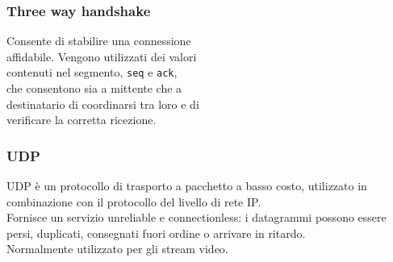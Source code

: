 \documentclass[aspectratio=169]{beamer}
\begin{document}
    \begin{frame}
        \frametitle{Three way handshake}
        Consente di stabilire una connessione\\ affidabile.
        Vengono utilizzati dei valori\\ contenuti nel segmento, \texttt{seq} e \texttt{ack},\\ che consentono sia a mittente che a\\ destinatario di coordinarsi tra loro e di\\ verificare la corretta ricezione.
    \end{frame}
    
    \begin{frame}
        \frametitle{UDP}
        UDP è un protocollo di trasporto a pacchetto a basso costo, utilizzato in combinazione con il protocollo del livello di rete IP.\\
        Fornisce un servizio unreliable e connectionless: i datagrammi possono essere persi, duplicati, consegnati fuori ordine o arrivare in ritardo.\\
        Normalmente utilizzato per gli stream video.
    \end{frame}
    
\end{document}
